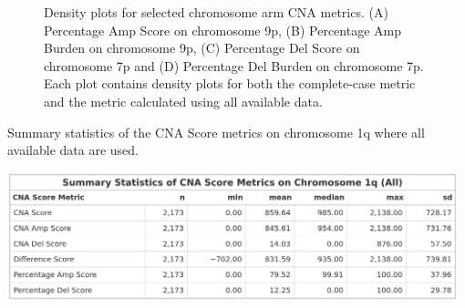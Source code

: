 \begin{figure}[H]
\begin{minipage}{.49\textwidth}
\end{minipage}
\hfill    
\begin{minipage}{.49\textwidth}
\end{minipage}
    \caption[Density plots for selected chromosome arm CNA metrics.]{Density plots for selected chromosome arm CNA metrics. (A) Percentage Amp Score on chromosome 9p, (B) Percentage Amp Burden on chromosome 9p, (C) Percentage Del Score on chromosome 7p and (D) Percentage Del Burden on chromosome 7p. Each plot contains density plots for both the complete-case metric and the metric calculated using all available data.}\label{fig:Plot-PerArm-DensityPlots}
\end{figure} 
\vfill 

\begin{table}[!ht]
\center
\caption[Summary statistics of the CNA Score metrics on chromosome 1q where all available data are used.]{Summary statistics of the CNA Score metrics on chromosome 1q  where all available data are used.}
\includegraphics[width = 0.98\textwidth]{../tables/Chapter_2/CNA_Score_Metric_All_Chr1q_Summary.png}
\label{tab:Score_All_Chr1q}
\end{table}

